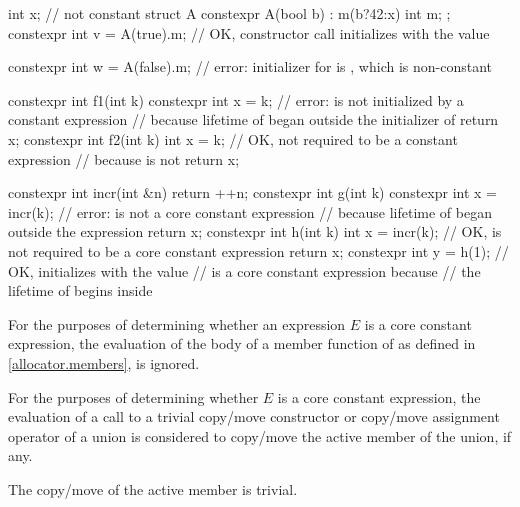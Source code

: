 \pnum
\begin{example}
\begin{codeblock}
int x;                              // not constant
struct A {
  constexpr A(bool b) : m(b?42:x) { }
  int m;
};
constexpr int v = A(true).m;        // OK, constructor call initializes  with the value 

constexpr int w = A(false).m;       // error: initializer for  is , which is non-constant

constexpr int f1(int k) {
  constexpr int x = k;              // error:  is not initialized by a constant expression
                                    // because lifetime of  began outside the initializer of 
  return x;
}
constexpr int f2(int k) {
  int x = k;                        // OK, not required to be a constant expression
                                    // because  is not 
  return x;
}

constexpr int incr(int &n) {
  return ++n;
}
constexpr int g(int k) {
  constexpr int x = incr(k);        // error:  is not a core constant expression
                                    // because lifetime of  began outside the expression 
  return x;
}
constexpr int h(int k) {
  int x = incr(k);                  // OK,  is not required to be a core constant expression
  return x;
}
constexpr int y = h(1);             // OK, initializes  with the value 
                                    //  is a core constant expression because
                                    // the lifetime of  begins inside 
\end{codeblock}
\end{example}

\pnum
For the purposes of determining
whether an expression $E$ is a core constant expression,
the evaluation of the body of a member function of 
as defined in \ref{allocator.members}, is ignored.

\pnum
For the purposes of determining whether $E$ is a core constant expression,
the evaluation of a call to
a trivial copy/move constructor or copy/move assignment operator of a union
is considered to copy/move the active member of the union, if any.
\begin{note}
The copy/move of the active member is trivial.
\end{note}


